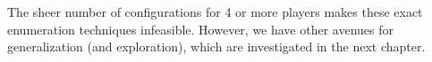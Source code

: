 \documentclass[twocolumn]{article}
\begin{document}
The sheer number of configurations for 4 or more players makes these
exact enumeration techniques infeasible. However, we have other
avenues for generalization (and exploration), which are investigated
in the next chapter.






\end{document}
